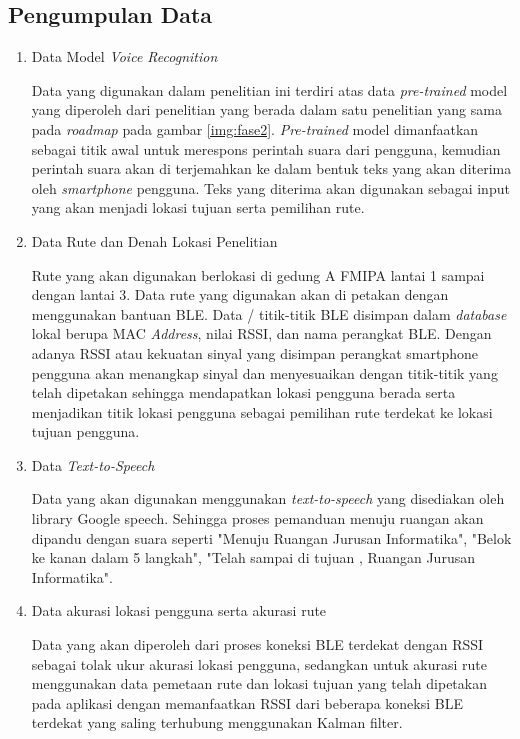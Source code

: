 \subsection{Pengumpulan Data}
\begin{enumerate}
\item Data Model \textit{Voice Recognition}
\par Data yang digunakan dalam penelitian ini terdiri atas data \textit{pre-trained} model yang diperoleh dari penelitian yang berada dalam satu penelitian yang sama pada \textit{roadmap} pada gambar \ref{img:fase2}. \textit{Pre-trained} model dimanfaatkan sebagai titik awal untuk merespons perintah suara dari pengguna, kemudian perintah suara akan di terjemahkan ke dalam bentuk teks yang akan diterima oleh \textit{smartphone} pengguna. Teks yang diterima akan digunakan sebagai input yang akan menjadi lokasi tujuan serta pemilihan rute.

\item Data Rute dan Denah Lokasi Penelitian
\par Rute yang akan digunakan berlokasi di gedung A FMIPA lantai 1 sampai dengan lantai 3. Data rute yang digunakan akan di petakan dengan menggunakan bantuan BLE. Data / titik-titik BLE disimpan dalam \textit{database} lokal berupa MAC \textit{Address}, nilai RSSI, dan nama perangkat BLE. Dengan adanya RSSI atau kekuatan sinyal yang disimpan perangkat smartphone pengguna akan menangkap sinyal dan menyesuaikan dengan titik-titik yang telah dipetakan sehingga mendapatkan lokasi pengguna berada serta menjadikan titik lokasi pengguna sebagai pemilihan rute terdekat ke lokasi tujuan pengguna.

\item Data \textit{Text-to-Speech}
\par Data yang akan digunakan menggunakan \textit{text-to-speech} yang disediakan oleh library Google speech. Sehingga proses pemanduan menuju ruangan akan dipandu dengan suara seperti "Menuju Ruangan Jurusan Informatika", "Belok ke kanan dalam 5 langkah", "Telah sampai di tujuan , Ruangan Jurusan Informatika".

\item Data akurasi lokasi pengguna serta akurasi rute
\par Data yang akan diperoleh dari proses koneksi BLE terdekat dengan RSSI sebagai tolak ukur akurasi lokasi pengguna, sedangkan untuk akurasi rute menggunakan data pemetaan rute dan lokasi tujuan yang telah dipetakan pada aplikasi dengan memanfaatkan RSSI dari beberapa koneksi BLE terdekat yang saling terhubung menggunakan Kalman filter.

\end{enumerate}



